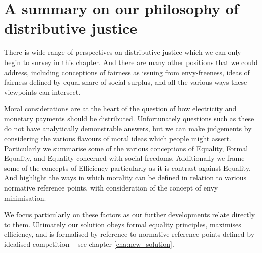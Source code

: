\section{A summary on our philosophy of distributive justice}\label{sec:philosophy_conclusion}


There is wide range of perspectives on distributive justice which we can only begin to survey in this chapter.
And there are many other positions that we could address, including conceptions of fairness as issuing from envy-freeness, ideas of fairness defined by equal share of social surplus, and all the various ways these viewpoints can intersect.%

Moral considerations are at the heart of the question of how electricity and monetary payments should be distributed.
Unfortunately questions such as these do not have analytically demonstrable answers, but we can make judgements by considering the various flavours of moral ideas which people might assert.
Particularly we summarise some of the various conceptions of Equality, Formal Equality, and Equality concerned with social freedoms.
Additionally we frame some of the concepts of Efficiency particularly as it is contrast against Equality.
And highlight the ways in which morality can be defined in relation to various normative reference points, with consideration of the concept of envy minimisation.

We focus particularly on these factors as our further developments relate directly to them.
Ultimately our solution obeys formal equality principles, maximises efficiency, and is formalised by reference to normative reference points defined by idealised competition -- see chapter \ref{cha:new_solution}.





